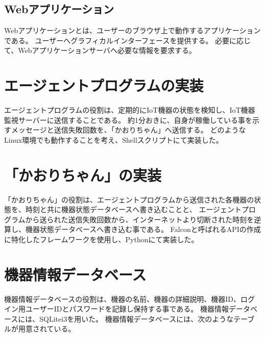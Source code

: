 \subsection{Webアプリケーション}
Webアプリケーションとは、ユーザーのブラウザ上で動作するアプリケーションである。
ユーザーへグラフィカルインターフェースを提供する。
必要に応じて、Webアプリケーションサーバへ必要な情報を要求する。

\section{エージェントプログラムの実装}
エージェントプログラムの役割は、定期的にIoT機器の状態を検知し、IoT機器監視サーバーに送信することである。
約1分おきに、自身が稼働している事を示すメッセージと送信失敗回数を、「かおりちゃん」へ送信する。
どのようなLinux環境でも動作することを考え、Shellスクリプトにて実装した。

\section{「かおりちゃん」の実装}
「かおりちゃん」の役割は、エージェントプログラムから送信された各機器の状態を、時刻と共に機器状態データベースへ書き込むことと、
エージェントプログラムから送られた送信失敗回数から、インターネットより切断された時刻を逆算し、機器状態データベースへ書き込む事である。
Falconと呼ばれるAPIの作成に特化したフレームワークを使用し、Pythonにて実装した。

\section{機器情報データベース}
機器情報データベースの役割は、機器の名前、機器の詳細説明、機器ID、ログイン用ユーザーIDとパスワードを記録し保持する事である。
機器情報データベースには、SQLitei3を用いた。
機器情報データベースには、次のようなテーブルが用意されている。
